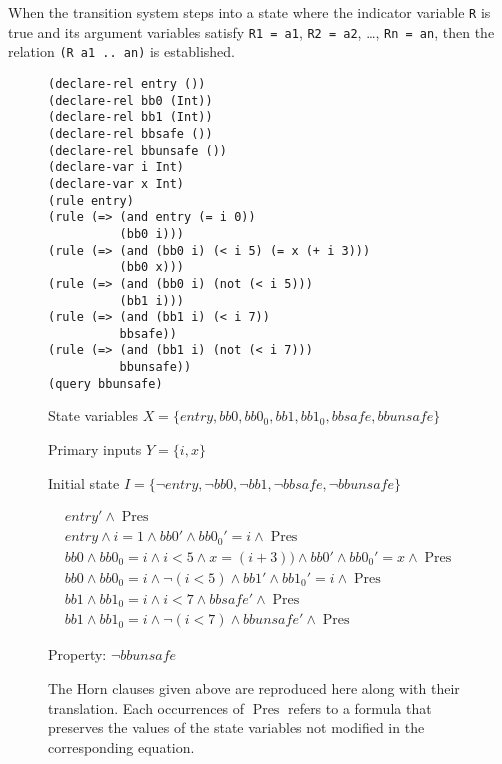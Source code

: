 \documentclass{article}
\DeclareMathOperator{\Preserve}{Pres}
\begin{document}
When the transition system steps into a state where the
indicator variable \texttt{R} is true and its argument variables satisfy
\texttt{R1\ =\ a1}, \texttt{R2\ =\ a2}, \ldots{}, \texttt{Rn\ =\ an},
then the relation \texttt{(R\ a1\ ..\ an)} is established.


\begin{figure}
\begin{verbatim}
(declare-rel entry ())
(declare-rel bb0 (Int))
(declare-rel bb1 (Int))
(declare-rel bbsafe ())
(declare-rel bbunsafe ())
(declare-var i Int)
(declare-var x Int)
(rule entry)
(rule (=> (and entry (= i 0))
          (bb0 i)))
(rule (=> (and (bb0 i) (< i 5) (= x (+ i 3)))
          (bb0 x)))
(rule (=> (and (bb0 i) (not (< i 5)))
          (bb1 i)))
(rule (=> (and (bb1 i) (< i 7))
          bbsafe))
(rule (=> (and (bb1 i) (not (< i 7)))
          bbunsafe))
(query bbunsafe)
\end{verbatim}

State variables $X = \{ entry, bb0, bb0_{0}, bb1, bb1_{0}, bbsafe, bbunsafe \}$

Primary inputs $Y = \{ i, x \}$

Initial state $I = \{ \neg entry, \neg bb0, \neg bb1, \neg bbsafe, \neg bbunsafe \}$

\begin{align}
  entry' \wedge \Preserve \\
entry \wedge i=1 \wedge bb0' \wedge bb0_{0}'=i \wedge \Preserve \\
bb0 \wedge bb0_{0} =i \wedge i<5 \wedge x=(i+3)) \wedge bb0' \wedge bb0_{0}'=x \wedge \Preserve \\
bb0 \wedge bb0_{0}=i \wedge \neg (i<5) \wedge bb1' \wedge bb1_{0}'=i \wedge \Preserve \\
bb1 \wedge bb1_{0}=i \wedge i<7 \wedge bbsafe' \wedge \Preserve \\
bb1 \wedge bb1_{0}=i \wedge \neg (i<7) \wedge bbunsafe' \wedge \Preserve
\end{align}

Property: $\neg bbunsafe$

\caption{The Horn clauses given above are reproduced here along with their translation. Each occurrences of $\Preserve$ refers to a formula that preserves the values of the state variables not modified in the corresponding equation.}
\end{figure}
\end{document}
